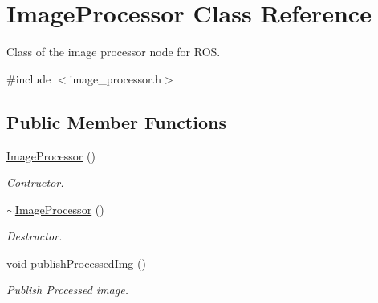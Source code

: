 \hypertarget{classImageProcessor}{}\section{Image\+Processor Class Reference}
\label{classImageProcessor}


Class of the image processor node for R\+OS.  




{\ttfamily \#include $<$image\+\_\+processor.\+h$>$}

\subsection*{Public Member Functions}
\begin{DoxyCompactItemize}
\item 
\mbox{\label{classImageProcessor_aa9201a4d14b20ac968919145db3a588b}} 
\hyperlink{classImageProcessor_aa9201a4d14b20ac968919145db3a588b}{Image\+Processor} ()
\begin{DoxyCompactList}\small\item\em Contructor. \end{DoxyCompactList}\item 
\mbox{\label{classImageProcessor_a2ff83cf5f0986ed04b7799499fe0defc}} 
\hyperlink{classImageProcessor_a2ff83cf5f0986ed04b7799499fe0defc}{$\sim$\+Image\+Processor} ()
\begin{DoxyCompactList}\small\item\em Destructor. \end{DoxyCompactList}\item 
void \hyperlink{classImageProcessor_ac46ce7c70848213b2221fb46f1b58f45}{publish\+Processed\+Img} ()
\begin{DoxyCompactList}\small\item\em Publish Processed image. \end{DoxyCompactList}\end{DoxyCompactItemize}
